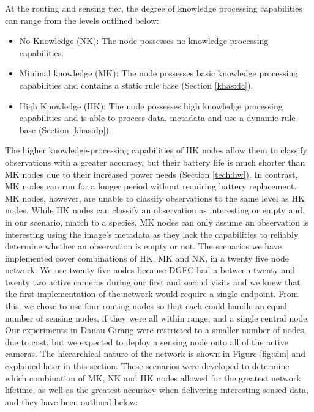 	At the routing and sensing tier, the degree of knowledge processing capabilities can range from the levels outlined below:
	
	\begin{itemize}
		\item No Knowledge (NK): The node possesses no knowledge processing capabilities.
		\item Minimal knowledge (MK): The node possesses basic knowledge processing capabilities and contains a static rule base (Section \ref{khas:dc}).
		\item High Knowledge (HK): The node possesses high knowledge processing capabilities and is able to process data, metadata and use a dynamic rule base (Section \ref{khas:dp}).
	\end{itemize}
	
	The higher knowledge-processing capabilities of HK nodes allow them to classify observations with a greater accuracy, but their battery life is much shorter than MK nodes due to their increased power needs (Section \ref{tech:hw}). In contrast, MK nodes can run for a longer period without requiring battery replacement. MK nodes, however, are unable to classify observations to the same level as HK nodes. While HK nodes can classify an observation as interesting or empty and, in our scenario, match to a species, MK nodes can only assume an observation is interesting using the image's metadata as they lack the capabilities to reliably determine whether an observation is empty or not. The scenarios we have implemented cover combinations of HK, MK and NK, in a twenty five node network. We use twenty five nodes because DGFC had a between twenty and twenty two active cameras during our first and second visits and we knew that the first implementation of the network would require a single endpoint. From this, we chose to use four routing nodes so that each could handle an equal number of sensing nodes, if they were all within range, and a single central node. Our experiments in Danau Girang were restricted to a smaller number of nodes, due to cost, but we expected to deploy a sensing node onto all of the active cameras. The hierarchical nature of the network is shown in Figure \ref{fig:sim} and explained later in this section. These scenarios were developed to determine which combination of MK, NK and HK nodes allowed for the greatest network lifetime, as well as the greatest accuracy when delivering interesting sensed data, and they have been outlined below:
	
